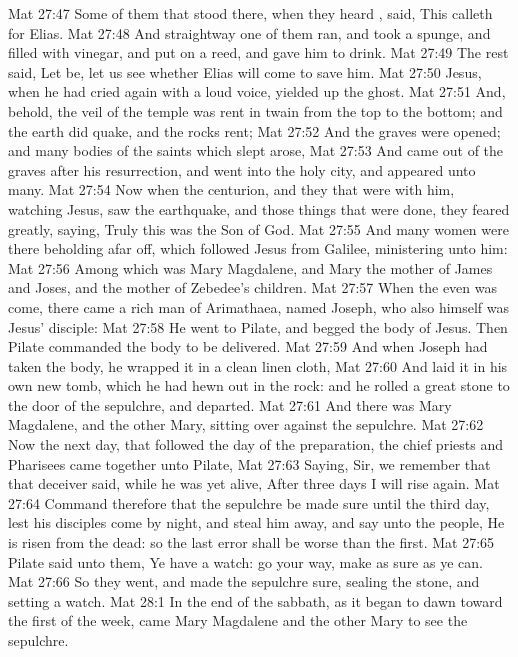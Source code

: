 \vs Mat 27:47 Some of them that stood there, when they heard , said, This  calleth for Elias.
\vs Mat 27:48 And straightway one of them ran, and took a spunge, and filled  with vinegar, and put  on a reed, and gave him to drink.
\vs Mat 27:49 The rest said, Let be, let us see whether Elias will come to save him.
\vs Mat 27:50 Jesus, when he had cried again with a loud voice, yielded up the ghost.
\vs Mat 27:51 And, behold, the veil of the temple was rent in twain from the top to the bottom; and the earth did quake, and the rocks rent;
\vs Mat 27:52 And the graves were opened; and many bodies of the saints which slept arose,
\vs Mat 27:53 And came out of the graves after his resurrection, and went into the holy city, and appeared unto many.
\vs Mat 27:54 Now when the centurion, and they that were with him, watching Jesus, saw the earthquake, and those things that were done, they feared greatly, saying, Truly this was the Son of God.
\vs Mat 27:55 And many women were there beholding afar off, which followed Jesus from Galilee, ministering unto him:
\vs Mat 27:56 Among which was Mary Magdalene, and Mary the mother of James and Joses, and the mother of Zebedee's children.
\vs Mat 27:57 When the even was come, there came a rich man of Arimathaea, named Joseph, who also himself was Jesus' disciple:
\vs Mat 27:58 He went to Pilate, and begged the body of Jesus. Then Pilate commanded the body to be delivered.
\vs Mat 27:59 And when Joseph had taken the body, he wrapped it in a clean linen cloth,
\vs Mat 27:60 And laid it in his own new tomb, which he had hewn out in the rock: and he rolled a great stone to the door of the sepulchre, and departed.
\vs Mat 27:61 And there was Mary Magdalene, and the other Mary, sitting over against the sepulchre.
\vs Mat 27:62 Now the next day, that followed the day of the preparation, the chief priests and Pharisees came together unto Pilate,
\vs Mat 27:63 Saying, Sir, we remember that that deceiver said, while he was yet alive, After three days I will rise again.
\vs Mat 27:64 Command therefore that the sepulchre be made sure until the third day, lest his disciples come by night, and steal him away, and say unto the people, He is risen from the dead: so the last error shall be worse than the first.
\vs Mat 27:65 Pilate said unto them, Ye have a watch: go your way, make  as sure as ye can.
\vs Mat 27:66 So they went, and made the sepulchre sure, sealing the stone, and setting a watch.
\vs Mat 28:1 In the end of the sabbath, as it began to dawn toward the first  of the week, came Mary Magdalene and the other Mary to see the sepulchre.
